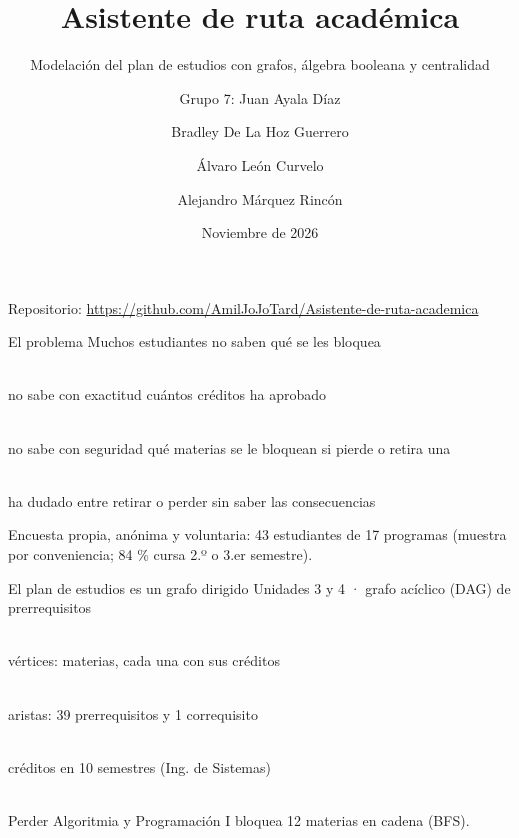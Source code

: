\documentclass[aspectratio=169,14pt]{beamer}
\title{Asistente de ruta académica}
\subtitle{Modelación del plan de estudios con grafos, álgebra booleana y centralidad}
\author{Grupo 7: Juan Ayala Díaz \and Bradley De La Hoz Guerrero \and Álvaro León Curvelo \and Alejandro Márquez Rincón}
\institute{Matemáticas Discretas (MAT 4021) · Universidad del Norte}
\date{Noviembre de 2026}
\newcommand{\unidad}[1]{{\footnotesize\color{gris}#1}\par\vspace{2mm}}
\newcommand{\tarjeta}[2]{\begin{minipage}[t]{0.3\textwidth}\centering{\fontsize{28}{30}\selectfont\bfseries\color{acento}#1}\\[2mm]{\small #2}\end{minipage}}
\begin{document}
\begin{frame}[plain]
\titlepage
\vfill\hfill{\small Repositorio: \url{https://github.com/AmilJoJoTard/Asistente-de-ruta-academica}}
\end{frame}

\begin{frame}{El problema}
\unidad{Muchos estudiantes no saben qué se les bloquea}\vspace{2mm}
\tarjeta{65 \%}{no sabe con exactitud cuántos créditos ha aprobado}\hfill
\tarjeta{42 \%}{no sabe con seguridad qué materias se le bloquean si pierde o retira una}\hfill
\tarjeta{37 \%}{ha dudado entre retirar o perder sin saber las consecuencias}
\vfill
{\footnotesize\color{gris}Encuesta propia, anónima y voluntaria: 43 estudiantes de 17 programas (muestra por conveniencia; 84 \% cursa 2.º o 3.er semestre).}
\end{frame}

\begin{frame}{El plan de estudios es un grafo dirigido}
\unidad{Unidades 3 y 4 · grafo acíclico (DAG) de prerrequisitos}
\tarjeta{62}{vértices: materias, cada una con sus créditos}\hfill
\tarjeta{40}{aristas: 39 prerrequisitos y 1 correquisito}\hfill
\tarjeta{155}{créditos en 10 semestres (Ing. de Sistemas)}
\vspace{3mm}

\\[1mm]
\vfill
{\scriptsize\color{gris}Perder Algoritmia y Programación I bloquea 12 materias en cadena (BFS).}
\end{frame}
\end{document}
